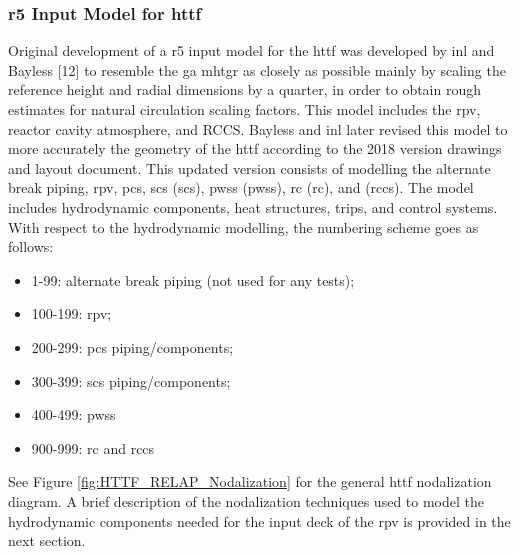 \documentclass[double,12pt]{beavtex}
\begin{document}
\subsubsection{\acrshort{r5} Input Model for \acrshort{httf}}

Original development of a \acrshort{r5} input model for the \acrshort{httf} was developed by \acrshort{inl} and Bayless [12] to resemble the \acrshort{ga} \acrshort{mhtgr} as closely as possible mainly by scaling the reference height and radial dimensions by a quarter, in order to obtain rough estimates for natural circulation scaling factors. This model includes the \acrshort{rpv}, reactor cavity atmosphere, and RCCS. Bayless and \acrshort{inl} later revised this model to more accurately the geometry of the \acrshort{httf} according to the 2018 version drawings and layout document. This updated version consists of modelling the alternate break piping, \acrshort{rpv}, \acrshort{pcs}, \acrlong{scs} (\acrshort{scs}), \acrlong{pwss} (\acrshort{pwss}), \acrlong{rc} (\acrshort{rc}), and (\acrshort{rccs}). The model includes hydrodynamic components, heat structures, trips, and control systems. With respect to the hydrodynamic modelling, the numbering scheme goes as follows:
\begin{itemize}
    \item 1-99: alternate break piping (not used for any tests);
    \item 100-199: \acrshort{rpv};
    \item 200-299: \acrshort{pcs} piping/components;
    \item 300-399: \acrshort{scs} piping/components;
    \item 400-499: \acrshort{pwss}
    \item 900-999: \acrshort{rc} and \acrshort{rccs}
\end{itemize}

See Figure \ref{fig:HTTF_RELAP_Nodalization} for the general \acrshort{httf} nodalization diagram. A brief description of the nodalization techniques used to model the hydrodynamic components needed for the input deck of the \acrshort{rpv} is provided in the next section. 
\end{document}
